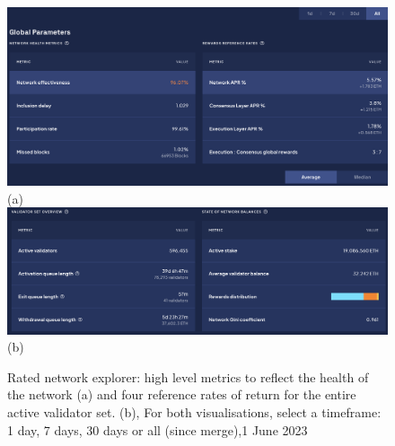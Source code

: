 \documentclass[UTF8]{article}
\begin{document}
{\begin{figure}[htbp]
\begin{center}
\includegraphics[width=\linewidth]{images/ratednw1}\\
(a)
\includegraphics[width=\linewidth]{images/ratednw2}\\
(b)
\caption{Rated network explorer: high level metrics to reflect the health of the network  (a) and four reference rates of return for the entire active validator set. (b), For both visualisations, select a timeframe: 1 day, 7 days, 30 days or all (since merge),1 June 2023}
\label{fig:ratednw1}
\end{center}
\end{figure}

}
\end{document}
